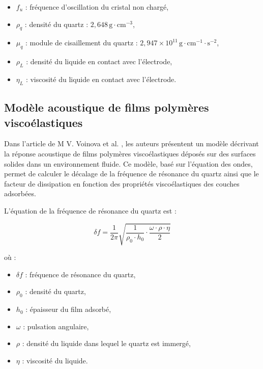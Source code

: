 \begin{itemize}[label=\textbullet]
    \item $f_u$ : fréquence d'oscillation du cristal non chargé,
    \item $\rho_q$ : densité du quartz : $2{,}648\, \text{g}\cdot\text{cm}^{-3}$,
    \item $\mu_q$ : module de cisaillement du quartz : $2{,}947 \times 10^{11}\, \text{g}\cdot\text{cm}^{-1}\cdot\text{s}^{-2}$,
    \item $\rho_L$ : densité du liquide en contact avec l’électrode,
    \item $\eta_L$ : viscosité du liquide en contact avec l’électrode.
\end{itemize}

\subsection{Modèle acoustique de films polymères viscoélastiques}
Dans l’article de M V. Voinova et al. \cite{M_V_Voinova_1999}, les auteurs présentent un modèle décrivant la réponse acoustique de films polymères viscoélastiques déposés sur des surfaces solides dans un environnement fluide.  
Ce modèle, basé sur l’équation des ondes, permet de calculer le décalage de la fréquence de résonance du quartz ainsi que le facteur de dissipation en fonction des propriétés viscoélastiques des couches adsorbées.

L’équation de la fréquence de résonance du quartz est :

\begin{equation}
    \delta f = \frac{1}{2\pi} \sqrt{\frac{1}{\rho_0 \cdot h_0} \cdot \frac{\omega \cdot \rho \cdot \eta}{2}}
    \label{eq:frequence_resonance}
\end{equation}

où :
\begin{itemize}[label=\textbullet]
    \item $\delta f$ : fréquence de résonance du quartz,
    \item $\rho_0$ : densité du quartz,
    \item $h_0$ : épaisseur du film adsorbé,
    \item $\omega$ : pulsation angulaire,
    \item $\rho$ : densité du liquide dans lequel le quartz est immergé,
    \item $\eta$ : viscosité du liquide.
\end{itemize}